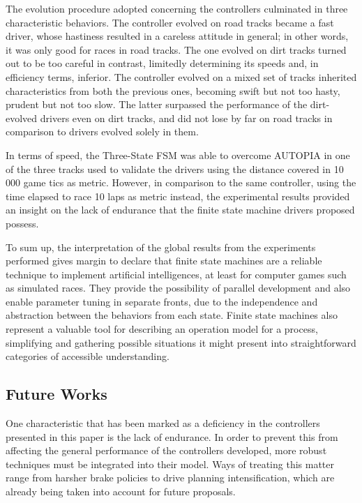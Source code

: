 	The evolution procedure adopted concerning the controllers culminated in three characteristic behaviors. The controller evolved on road tracks became a fast driver, whose hastiness resulted in a careless attitude in general; in other words, it was only good for races in road tracks. The one evolved on dirt tracks turned out to be too careful in contrast, limitedly determining its speeds and, in efficiency terms, inferior. The controller evolved on a mixed set of tracks inherited characteristics from both the previous ones, becoming swift but not too hasty, prudent but not too slow. The latter surpassed the performance of the dirt-evolved drivers even on dirt tracks, and did not lose by far on road tracks in comparison to drivers evolved solely in them.

	In terms of speed, the Three-State FSM was able to overcome AUTOPIA in one of the three tracks used to validate the drivers using the distance covered in 10 000 game tics as metric. However, in comparison to the same controller, using the time elapsed to race 10 laps as metric instead, the experimental results provided an insight on the lack of endurance that the finite state machine drivers proposed possess.

	To sum up, the interpretation of the global results from the experiments performed gives margin to declare that finite state machines are a reliable technique to implement artificial intelligences, at least for computer games such as simulated races. They provide the possibility of parallel development and also enable parameter tuning in separate fronts, due to the independence and abstraction between the behaviors from each state. Finite state machines also represent a valuable tool for describing an operation model for a process, simplifying and gathering possible situations it might present into straightforward categories of accessible understanding.

\subsection{Future Works} \label{subsec:Future}

	One characteristic that has been marked as a deficiency in the controllers presented in this paper is the lack of endurance. In order to prevent this from affecting the general performance of the controllers developed, more robust techniques must be integrated into their model. Ways of treating this matter range from harsher brake policies to drive planning intensification, which are already being taken into account for future proposals.

